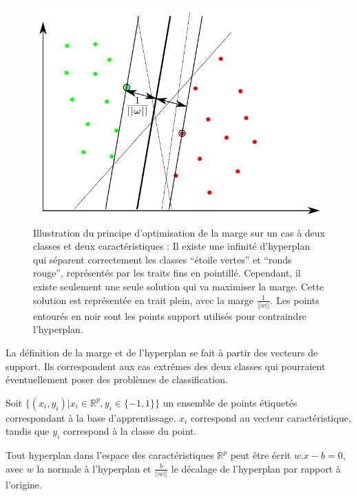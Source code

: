 \begin{figure}[h]
	\label{fig:multiPlansSeparationSVM}
	\begin{center}
	\includegraphics[width=15cm]{images/multiPlansSeparationSVM}
	\end{center}
	\caption[Illustration du principe d'optimisation de la marge sur le SVM]{Illustration du principe d'optimisation de la marge sur un cas à deux classes et deux caractéristiques : Il existe une infinité d'hyperplan qui séparent correctement les classes ``étoile vertes'' et ``ronds rouge'', représentés par les traits fins en pointillé. Cependant, il existe seulement une seule solution qui va maximiser la marge. Cette solution est représentée en trait plein, avec la marge $\frac{1}{||w||}$. Les points entourés en noir sont les points support utilisés pour contraindre l'hyperplan. }
\end{figure}


La définition de la marge et de l'hyperplan se fait à partir des vecteurs de support. Ils correspondent aux cas extrêmes des deux classes qui pourraient éventuellement poser des problèmes de classification.


Soit $\{(x_i, y_i) | x_i \in \mathbb{R}^p , y_i \in \{ -1, 1 \} \}$ un ensemble de points étiquetés correspondant à la base d'apprentissage. $x_i$ correspond au vecteur caractéristique, tandis que $y_i$ correspond à la classe du point.

Tout hyperplan dans l'espace des caractéristiques $\mathbb{R}^p$ peut être écrit $w . x - b = 0$, avec $w$ la normale à l'hyperplan et $\frac{b}{ ||w|| }$ le décalage de l'hyperplan par rapport à l'origine. 

